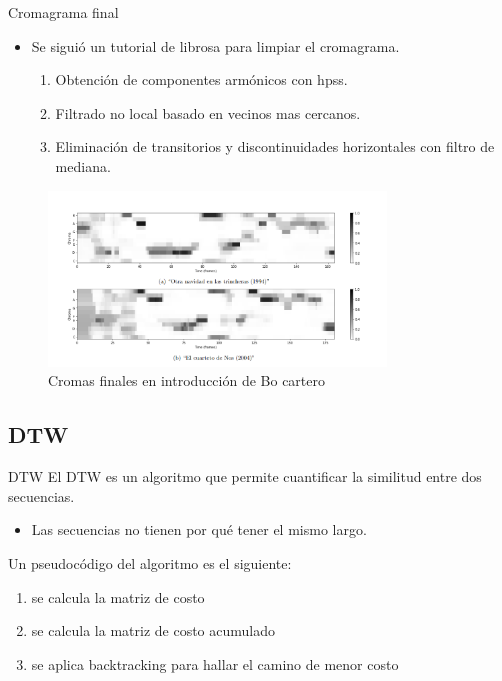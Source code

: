 \documentclass{beamer}
\begin{document}
\begin{frame}{Cromagrama final}
\begin{itemize}
    \item Se siguió un tutorial de librosa para limpiar el cromagrama. 
    \begin{enumerate}
        \item Obtención de componentes armónicos con hpss. 
        \item Filtrado no local basado en vecinos mas cercanos.
        \item Eliminación de transitorios y discontinuidades horizontales con filtro de mediana. 
    \end{enumerate}
\end{itemize}
\begin{figure}[!h]
    \centering
    \includegraphics[width=0.8\textwidth]{chromas/pretty_cromas.png}
    \caption{Cromas finales en introducción de Bo cartero}
    \label{pretty_cromas}
\end{figure}
\end{frame}


\subsection{DTW}

\begin{frame}{DTW}
    El DTW es un algoritmo que permite cuantificar la similitud entre dos secuencias.
    \begin{itemize}
        \item Las secuencias no tienen por qué tener el mismo largo.
    \end{itemize}
    \vfill
    Un pseudocódigo del algoritmo es el siguiente:
    \begin{enumerate}
        \item se calcula la matriz de costo
        \item se calcula la matriz de costo acumulado
        \item se aplica backtracking para hallar el camino de menor costo
    \end{enumerate}
\end{frame}
\end{document}

